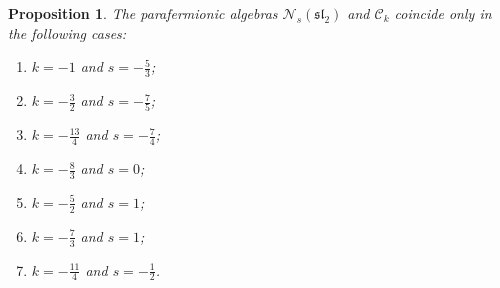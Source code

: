 \documentclass[pdftex]{sigma}
\numberwithin{equation}{section}
\newtheorem{Proposition}[Theorem]{Proposition}
\begin{document}
\begin{Proposition} \label{pf_coincidence}
	The parafermionic algebras $ \mathcal N_s(\mathfrak{sl}_2)$ and $\mathcal C_k$ coincide only in the following cases:
	\begin{enumerate}\itemsep=0pt
		\item[$(1)$] $k=-1$ and $s=-\frac 53$;
		\item[$(2)$] $k=-\frac 32$ and $s=-\frac 75$;
		\item[$(3)$] $k=-\frac{13}4$ and $s=-\frac 74$;	
		\item[$(4)$] $k=-\frac 83$ and $s= 0$;	
		\item[$(5)$] $k=-\frac 52$ and $s=1$;	
		\item[$(6)$] $k=-\frac 73$ and $s=1$;	
		\item[$(7)$] $k=-\frac{11}4$ and $s=-\frac 12$.
	\end{enumerate}
\end{Proposition}
\end{document}
